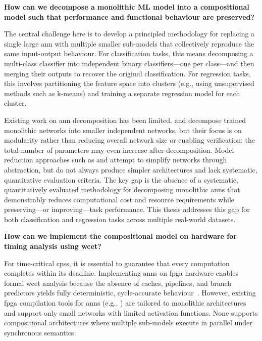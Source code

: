 \begin{questions}
\item \textbf{How can we decompose a monolithic ML model into a compositional model such that performance and functional behaviour are preserved?}
\label{rq:decomposition}

The central challenge here is to develop a principled methodology for replacing a single large \gls{ann} with multiple smaller sub-models that collectively reproduce the same input-output behaviour. For classification tasks, this means decomposing a multi-class classifier into independent binary classifiers---one per class---and then merging their outputs to recover the original classification. For regression tasks, this involves partitioning the feature space into clusters (e.g., using unsupervised methods such as k-means) and training a separate regression model for each cluster.

Existing work on \gls{ann} decomposition has been limited. \cite{watanabe_modular_2017} and \cite{pan_decomposing_2020} decompose trained monolithic networks into smaller independent networks, but their focus is on modularity rather than reducing overall network size or enabling verification; the total number of parameters may even increase after decomposition. Model reduction approaches such as \cite{gokulanathan_simplifying_2020} and \cite{elboher_abstraction-based_2020} attempt to simplify networks through abstraction, but do not always produce simpler architectures and lack systematic, quantitative evaluation criteria. The key gap is the absence of a systematic, quantitatively evaluated methodology for decomposing monolithic \glspl{ann} that demonstrably reduces computational cost and resource requirements while preserving---or improving---task performance. This thesis addresses this gap for both classification and regression tasks across multiple real-world datasets.


\item \textbf{How can we implement the compositional model on hardware for timing analysis using \gls{wcet}?}
\label{rq:hardware}

For time-critical \glspl{cps}, it is essential to guarantee that every computation completes within its deadline. Implementing \glspl{ann} on \gls{fpga} hardware enables formal \gls{wcet} analysis because the absence of caches, pipelines, and branch predictors yields fully deterministic, cycle-accurate behaviour~\cite{wilhelm_worst-case_2008}. However, existing \gls{fpga} compilation tools for \glspl{ann} (e.g., \cite{himavathi_feedforward_2007, nguyen_efficient_2018, saric_fpga-based_2020}) are tailored to monolithic architectures and support only small networks with limited activation functions. None supports compositional architectures where multiple sub-models execute in parallel under synchronous semantics.


\end{questions}
